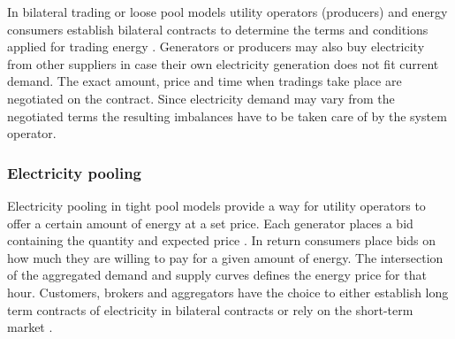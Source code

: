 In bilateral trading or loose pool models utility operators (producers) and energy consumers establish bilateral contracts to determine the terms and conditions applied for trading energy \cite{onaiwu2009does,chao1999design}. Generators or producers may also buy electricity from other suppliers in case their own electricity generation does not fit current demand. The exact amount, price and time when tradings take place are negotiated on the contract. Since electricity demand may vary from the negotiated terms the resulting imbalances have to be taken care of by the system operator. 

\subsubsection{Electricity pooling}

Electricity pooling in tight pool models provide a way for utility operators to offer a certain amount of energy at a set price. Each generator places a bid containing the quantity and expected price \cite{barroso2005classification}. In return consumers place bids on how much they are willing to pay for a given amount of energy. The intersection of the aggregated demand and supply curves defines the energy price for that hour. 
Customers, brokers and aggregators have the choice to either establish long term contracts of electricity in bilateral contracts or rely on the short-term market \cite{hogan1997reshaping}.









